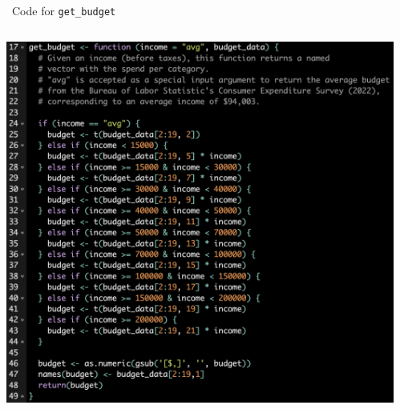 \begin{frame}{\sR\ Code for \texttt{get\_budget}}
        \begin{columns}[c]
            \begin{column}{0.65\textwidth}
                \includegraphics[height=0.8\textheight]{../Misc/RCode_budget1.png}
            \end{column}
            \begin{column}{0.3\textwidth}

\end{column}
\end{columns}
\end{frame}
